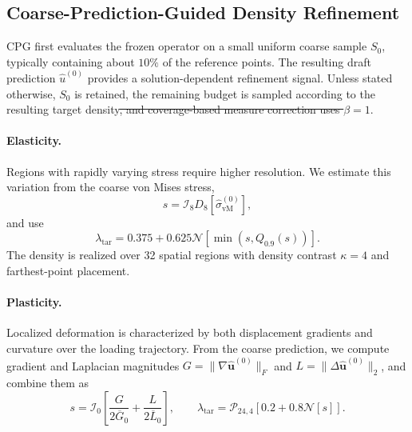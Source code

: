 \documentclass{article}
\providecommand{\DIFdeltex}[1]{{\protect\color{red}\sout{#1}}}                      %
\providecommand{\DIFdelbegin}{} %
\providecommand{\DIFdelend}{} %
\providecommand{\DIFdel}[1]{\texorpdfstring{\DIFdeltex{#1}}{}} %
\newcommand{\DIFscaledelfig}{0.5}
\newlength{\DIFdelgraphicswidth} %
\newlength{\DIFdelgraphicsheight} %
\newcommand{\DIFdelincludegraphics}[2][]{%
\sbox{\DIFdelgraphicsbox}{\DIFOincludegraphics[#1]{#2}}%
\settoboxwidth{\DIFdelgraphicswidth}{\DIFdelgraphicsbox} %
\settoboxtotalheight{\DIFdelgraphicsheight}{\DIFdelgraphicsbox} %
\scalebox{\DIFscaledelfig}{%
\parbox[b]{\DIFdelgraphicswidth}{\usebox{\DIFdelgraphicsbox}\\[-\baselineskip] \rule{\DIFdelgraphicswidth}{0em}}\llap{\resizebox{\DIFdelgraphicswidth}{\DIFdelgraphicsheight}{%
\setlength{\unitlength}{\DIFdelgraphicswidth}%
\begin{picture}(1,1)%
\thicklines\linethickness{2pt} %
{\color[rgb]{1,0,0}\put(0,0){\framebox(1,1){}}}%
{\color[rgb]{1,0,0}\put(0,0){\line( 1,1){1}}}%
{\color[rgb]{1,0,0}\put(0,1){\line(1,-1){1}}}%
\end{picture}%
}\hspace*{3pt}}} %
} %
\DeclareRobustCommand{\DIFdelbegin}{\DIFOdelbegin \let\includegraphics\DIFdelincludegraphics} %
\DeclareRobustCommand{\DIFdelend}{\DIFOaddend \let\includegraphics\DIFOincludegraphics} %
\begin{document}
\DIFdelend \subsection{Coarse-Prediction-Guided Density Refinement}
\label{app:cpg_density_design}

CPG first evaluates the frozen operator on a small uniform coarse sample
$S_0$, typically containing about $10\%$ of the reference points. The resulting
draft prediction $\widehat u^{(0)}$ provides a solution-dependent refinement
signal. Unless stated otherwise, $S_0$ is retained, the remaining budget is
sampled according to the resulting target density\DIFdelbegin \DIFdel{, and coverage-based
measure correction uses $\beta=1$}\DIFdelend .

\paragraph{Elasticity.}
Regions with rapidly varying stress require higher resolution. We estimate this
variation from the coarse von Mises stress,
\[
    s
    =\mathcal{I}_8D_8[
        \widehat{\sigma}_{\mathrm{vM}}^{(0)}
    ],
\]
and use
\begin{equation}
    \lambda_{\mathrm{tar}}
    =0.375
    +0.625\mathcal{N}\!\left[
        \min(s,Q_{0.9}(s))
    \right].
    \label{eq:app_cpg_elasticity_density}
\end{equation}
The density is realized over 32 spatial regions with density contrast
$\kappa=4$ and farthest-point placement.

\paragraph{Plasticity.}
Localized deformation is characterized by both displacement gradients and
curvature over the loading trajectory. From the coarse prediction, we compute
gradient and Laplacian magnitudes
$G=\|\nabla\widehat{\mathbf u}^{(0)}\|_F$ and
$L=\|\Delta\widehat{\mathbf u}^{(0)}\|_2$, and combine them as
\begin{equation}
    s
    =\mathcal{I}_0\!\left[
        \frac{G}{2\overline G_0}
        +\frac{L}{2\overline L_0}
    \right],
    \qquad
    \lambda_{\mathrm{tar}}
    =\mathcal{P}_{24,4}
       [0.2+0.8\mathcal{N}[s]].
    \label{eq:app_cpg_plasticity_density}
\end{equation}
\end{document}
